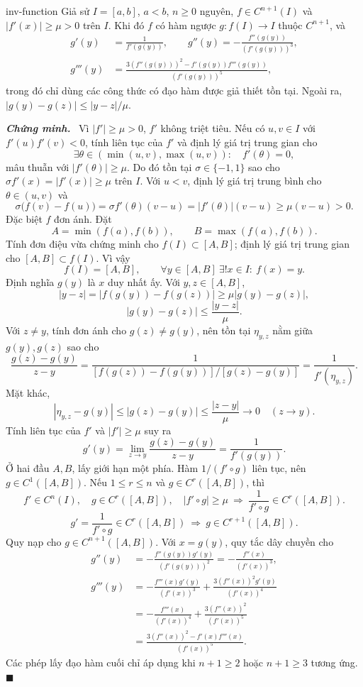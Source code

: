 \documentclass[12pt,a4paper,oneside]{book}
\numberwithin{algorithm}{chapter}
\theoremstyle{definition}
\newenvironment{chungminh}{\par\medskip\noindent\textbf{\textit{\color{mainblue}Chứng minh.}}\ }{\hfill$\blacksquare$\par\medskip}
\begin{document}
\begin{menhde}{}{inv-function}
Giả sử $I=[a,b]$, $a<b$, $n\geq0$ nguyên, $f\in C^{n+1}(I)$ và $|f'(x)|\geq\mu>0$ trên $I$. Khi đó $f$ có hàm ngược $g:f(I)\to I$ thuộc $C^{n+1}$, và
\begin{equation}\label{eq:inv-derivatives}
\begin{aligned}
 g'(y)&=\frac1{f'(g(y))},\qquad
 g''(y)=-\frac{f''(g(y))}{(f'(g(y)))^3},\\
 g'''(y)&=\frac{3(f''(g(y)))^2-f'(g(y))f'''(g(y))}{(f'(g(y)))^5},
\end{aligned}
\end{equation}
trong đó chỉ dùng các công thức có đạo hàm được giả thiết tồn tại.
Ngoài ra, $|g(y)-g(z)|\leq|y-z|/\mu$.
\end{menhde}
\begin{chungminh}
Vì $|f'|\geq\mu>0$, $f'$ không triệt tiêu. Nếu có $u,v\in I$ với
$f'(u)f'(v)<0$, tính liên tục của $f'$ và định lý giá trị trung gian cho
\[
 \exists\theta\in(\min(u,v),\max(u,v)):\quad f'(\theta)=0,
\]
mâu thuẫn với $|f'(\theta)|\geq\mu$. Do đó tồn tại
$\sigma\in\{-1,1\}$ sao cho $\sigma f'(x)=|f'(x)|\geq\mu$ trên $I$.
Với $u<v$, định lý giá trị trung bình cho $\theta\in(u,v)$ và
\[
 \sigma\bigl(f(v)-f(u)\bigr)
 =\sigma f'(\theta)(v-u)=|f'(\theta)|(v-u)
 \geq\mu(v-u)>0.
\]
Đặc biệt $f$ đơn ánh. Đặt
\[
 A=\min(f(a),f(b)),\qquad B=\max(f(a),f(b)).
\]
Tính đơn điệu vừa chứng minh cho $f(I)\subset[A,B]$; định lý giá trị trung gian cho $[A,B]\subset f(I)$. Vì vậy
\[
 f(I)=[A,B],\qquad
 \forall y\in[A,B]\ \exists!x\in I:\ f(x)=y.
\]
Định nghĩa $g(y)$ là $x$ duy nhất ấy. Với $y,z\in[A,B]$,
\[
 |y-z|=|f(g(y))-f(g(z))|
 \geq\mu|g(y)-g(z)|,
\]
\[
 |g(y)-g(z)|\leq\frac{|y-z|}{\mu}.
\]
Với $z\ne y$, tính đơn ánh cho $g(z)\ne g(y)$, nên tồn tại
$\eta_{y,z}$ nằm giữa $g(y),g(z)$ sao cho
\[
 \frac{g(z)-g(y)}{z-y}
 =\frac1{[f(g(z))-f(g(y))]/[g(z)-g(y)]}
 =\frac1{f'(\eta_{y,z})}.
\]
Mặt khác,
\[
 |\eta_{y,z}-g(y)|\leq|g(z)-g(y)|\leq\frac{|z-y|}{\mu}
 \longrightarrow0\quad(z\to y).
\]
Tính liên tục của $f'$ và $|f'|\geq\mu$ suy ra
\[
 g'(y)=\lim_{z\to y}\frac{g(z)-g(y)}{z-y}
 =\frac1{f'(g(y))}.
\]
Ở hai đầu $A,B$, lấy giới hạn một phía. Hàm $1/(f'\circ g)$ liên tục, nên $g\in C^1([A,B])$.
Nếu $1\leq r\leq n$ và $g\in C^r([A,B])$, thì
\[
 f'\in C^n(I),\quad g\in C^r([A,B]),\quad |f'\circ g|\geq\mu
 \ \Longrightarrow\ \frac1{f'\circ g}\in C^r([A,B]).
\]
\[
 g'=\frac1{f'\circ g}\in C^r([A,B])
 \ \Longrightarrow\ g\in C^{r+1}([A,B]).
\]
Quy nạp cho $g\in C^{n+1}([A,B])$.
Với $x=g(y)$, quy tắc dây chuyền cho
\begin{align*}
 g''(y)
 &=-\frac{f''(g(y))g'(y)}{(f'(g(y)))^2}
 =-\frac{f''(x)}{(f'(x))^3},\\
 g'''(y)
 &=-\frac{f'''(x)g'(y)}{(f'(x))^3}
   +\frac{3(f''(x))^2g'(y)}{(f'(x))^4}\\
 &=-\frac{f'''(x)}{(f'(x))^4}
   +\frac{3(f''(x))^2}{(f'(x))^5}\\
 &=\frac{3(f''(x))^2-f'(x)f'''(x)}{(f'(x))^5}.
\end{align*}
Các phép lấy đạo hàm cuối chỉ áp dụng khi $n+1\geq2$ hoặc $n+1\geq3$ tương ứng.
\end{chungminh}
\end{document}
